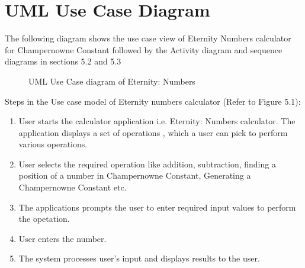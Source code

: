 \documentclass[12pt, a4paper]{report}
\begin{document}
\section{UML Use Case Diagram}
\quad The following diagram shows the use case view of Eternity Numbers calculator for Champernowne Constant followed by the Activity diagram and sequence diagrams in sections 5.2 and 5.3

\begin{figure}[h]
    \centering
    \caption{UML Use Case diagram of Eternity: Numbers}
    \label{fig:UML Use Case diagram of Eternity: Numbers}
\end{figure}

Steps in the Use case model of Eternity numbers calculator (Refer to Figure 5.1):
\begin{enumerate}

    \item User starts the calculator application i.e. Eternity: Numbers calculator. The application displays a set of operations , which a user can pick to perform various operations.
    \item User selects the required operation like addition, subtraction, finding a position of a number in Champernowne Constant, Generating a Champernowne Constant etc.
    \item The applications prompts the user to enter required input values to perform the opetation.
    \item User enters the number.
    \item The system processes user's input and displays results to the user.
\end{enumerate}
\end{document}
